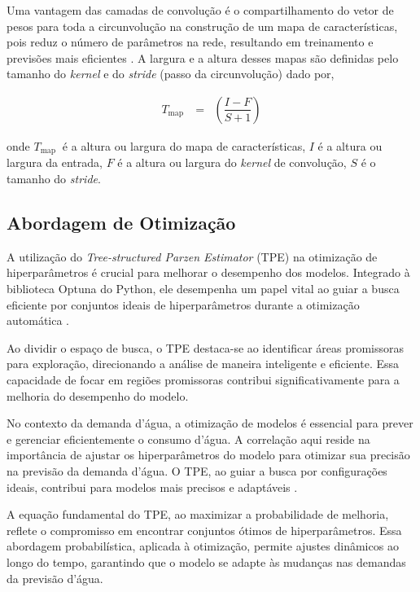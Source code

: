 Uma vantagem das camadas de convolução é o compartilhamento do vetor de pesos para toda a circunvolução na construção de um mapa de características, pois reduz o número de parâmetros na rede, resultando em treinamento e previsões mais eficientes \cite{lucas_2019}.
A largura e a altura desses mapas são definidas pelo tamanho do \textit{kernel} e do \textit{stride} (passo da circunvolução) dado por,
 
 \begin{eqnarray}
 	T_{\text {map }}&=&\left(\dfrac{I-F}{S+1}\right)\label{cnn1}
 \end{eqnarray}
 
 \noindent onde
 $T_{\text {map }}$ é a altura ou largura do mapa de características,
 $I$ é a altura ou largura da entrada,
 $F$ é a altura ou largura do \textit{kernel} de convolução,
 $S$ é o tamanho do \textit{stride}.
 
 \subsection{Abordagem de Otimiza\c c\~ao}
 
 A utilização do \textit{Tree-structured Parzen Estimator} (TPE) na otimização de hiperparâmetros é crucial para melhorar o desempenho dos modelos. Integrado à biblioteca Optuna do Python, ele desempenha um papel vital ao guiar a busca eficiente por conjuntos ideais de hiperparâmetros durante a otimização automática \cite{tpe}.
 
 Ao dividir o espaço de busca, o TPE destaca-se ao identificar áreas promissoras para exploração, direcionando a análise de maneira inteligente e eficiente. Essa capacidade de focar em regiões promissoras contribui significativamente para a melhoria do desempenho do modelo.
 
 No contexto da demanda d'água, a otimização de modelos é essencial para prever e gerenciar eficientemente o consumo d'água. A correlação aqui reside na importância de ajustar os hiperparâmetros do modelo para otimizar sua precisão na previsão da demanda d'água. O TPE, ao guiar a busca por configurações ideais, contribui para modelos mais precisos e adaptáveis \cite{tpe}.
 
 A equação fundamental do TPE, ao maximizar a probabilidade de melhoria, reflete o compromisso em encontrar conjuntos ótimos de hiperparâmetros. Essa abordagem probabilística, aplicada à otimização, permite ajustes dinâmicos ao longo do tempo, garantindo que o modelo se adapte às mudanças nas demandas da previsão d'água.
 
